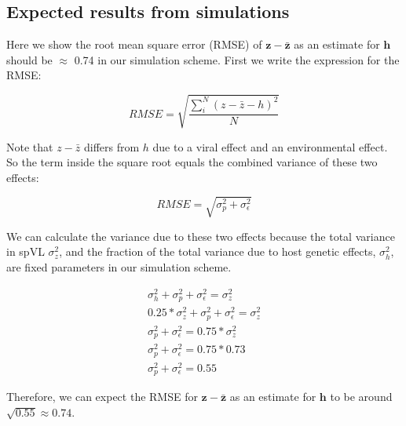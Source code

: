 \documentclass[11pt]{article}
\begin{document}
\begin{doublespace}

\subsection*{Expected results from simulations}

Here we show the root mean square error (RMSE) of $\bm{z} - \bm{\bar{z}}$ as an estimate for $\bm{h}$ should be $\approx$ 0.74 in our simulation scheme. First we write the expression for the RMSE:

\begin{equation}
    RMSE = \sqrt{\frac{\sum_i^N(z - \bar{z} - h)^2}{N}}
\end{equation}

Note that $z - \bar{z}$ differs from $h$ due to a viral effect and an environmental effect. So the term inside the square root equals the combined variance of these two effects:

\begin{equation}
    RMSE = \sqrt{\sigma^2_{p} + \sigma^2_\epsilon}
\end{equation}

We can calculate the variance due to these two effects because the total variance in spVL $\sigma^2_z$, and the fraction of the total variance due to host genetic effects, $\sigma^2_{h}$, are fixed parameters in our simulation scheme.

\begin{equation}
\begin{split}
    \sigma^2_{h} + \sigma^2_{p} + \sigma^2_\epsilon = \sigma^2_z \\
    0.25 * \sigma^2_{z} + \sigma^2_{p} + \sigma^2_\epsilon = \sigma^2_z \\
    \sigma^2_{p} + \sigma^2_\epsilon = 0.75 * \sigma^2_z \\
    \sigma^2_{p} + \sigma^2_\epsilon = 0.75 * 0.73 \\
    \sigma^2_{p} + \sigma^2_\epsilon = 0.55
\end{split}
\end{equation}

Therefore, we can expect the RMSE for $\bm{z} - \bm{\bar{z}}$ as an estimate for $\bm{h}$ to be around $\sqrt{0.55} \approx 0.74$. 

\newpage

\begin{figure}[H]
	\begin{tikzpicture}
	

\end{tikzpicture}
\end{figure}
\end{doublespace}
\end{document}
